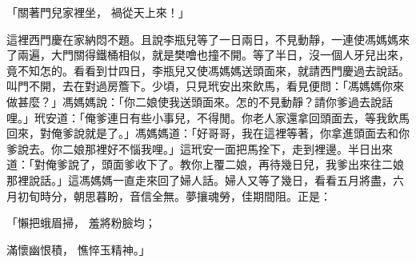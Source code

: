 「關著門兒家裡坐，  禍從天上來！」

這裡西門慶在家納悶不題。且說李瓶兒等了一日兩日，不見動靜，一連使馮媽媽來了兩遍，大門關得鐵桶相似，就是樊噲也撞不開。等了半日，沒一個人牙兒出來，竟不知怎的。看看到廿四日，李瓶兒又使馮媽媽送頭面來，就請西門慶過去說話。叫門不開，去在對過房簷下。少頃，只見玳安出來飲馬，看見便問：「馮媽媽你來做甚麼？」馮媽媽說：「你二娘使我送頭面來。怎的不見動靜？請你爹過去說話哩。」玳安道：「俺爹連日有些小事兒，不得閒。你老人家還拿回頭面去，等我飲馬回來，對俺爹說就是了。」馮媽媽道：「好哥哥，我在這裡等著，你拿進頭面去和你爹說去。你二娘那裡好不惱我哩。」這玳安一面把馬拴下，走到裡邊。半日出來道：「對俺爹說了，頭面爹收下了。教你上覆二娘，再待幾日兒，我爹出來往二娘那裡說話。」這馮媽媽一直走來回了婦人話。婦人又等了幾日，看看五月將盡，六月初旬時分，朝思暮盼，音信全無。夢攘魂勞，佳期間阻。正是：

「懶把蛾眉掃，  羞將粉臉均；

滿懷幽恨積，  憔悴玉精神。」

